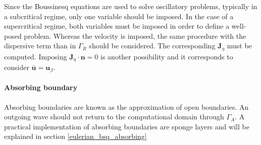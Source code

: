 Since the Boussinesq equations are used to solve oscillatory problems, typically in a subcritical regime, only one variable should be imposed. In the case of a supercritical regime, both variables must be imposed in order to define a well-posed problem. Whereas the velocity is imposed, the same procedure with the dispersive term than in $\Gamma_R$ should be considered. The corresponding $\mathbf{J}_\eta$ must be computed. Imposing $\mathbf{J}_\eta\cdot\mathbf{n}=0$ is another possibility and it corresponds to consider $\bar{\mathbf{u}} = \mathbf{u}_\beta$.


\paragraph{Absorbing boundary} Absorbing boundaries are known as the approximation of open boundaries. An outgoing wave should not return to the computational domain through $\Gamma_A$. A practical implementation of absorbing boundaries are sponge layers \cite{israeli1981, wei1995} and will be explained in section \ref{eulerian_bsq_absorbing}





